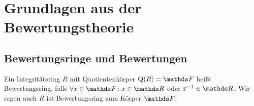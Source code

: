 \documentclass[ngerman,fontsize=11pt, paper=a4, parskip=half, titlepage=true, toc=bib]{scrartcl}
\begin{document}
\section{Grundlagen aus der Bewertungstheorie}

\subsection{Bewertungsringe und Bewertungen}


\begin{Def}[Bewertungsring]\label{defbewertungsring}
  Ein Integritätsring $R$ mit Quotientenkörper $\Quot(R)=\F$ heißt
  Bewertungsring, falls $\forall x\in\F\colon x\in\R$ oder
  $x^{-1}\in\R$.
  Wir sagen auch $R$ ist Bewertungsring zum Körper $\F$.
\end{Def}
\end{document}
